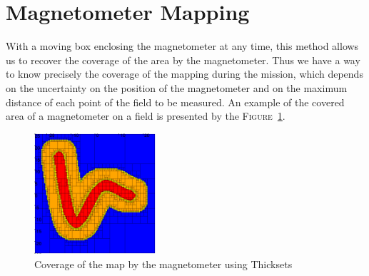 \section*{Magnetometer Mapping}
    With a moving box enclosing the magnetometer at any time, this method allows us to recover the coverage of the area by the magnetometer. Thus we have a way to know precisely the coverage of the mapping during the mission, which depends on the uncertainty on the position of the magnetometer and on the maximum distance of each point of the field to be measured. An example of the covered area of a magnetometer on a field is presented by the \textsc{Figure}~\ref{fig:thickset_trajectory}.

    \begin{figure}[!htb]
        \centering
        \includegraphics[width=0.4\textwidth]{imgs/thickset_fine.png}
        \caption{\label{fig:thickset_trajectory} Coverage of the map by the magnetometer using Thicksets}
    \end{figure}
    
    
